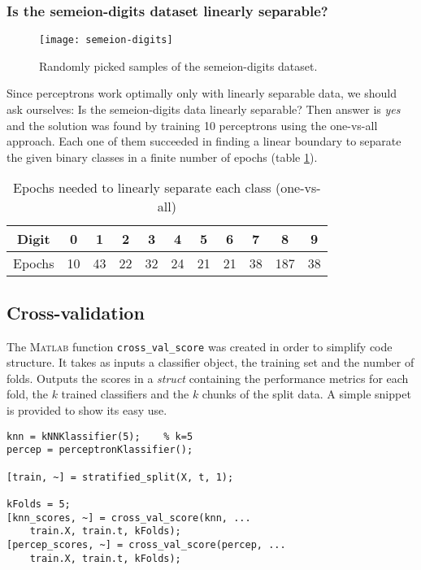 \subsubsection{Is the semeion-digits dataset linearly separable?}
\begin{figure}[]
	\centering
	\texttt{[image: semeion-digits]}
	\caption{Randomly picked samples of the semeion-digits dataset.}
	\label{fig:semeion-digits}
\end{figure}

Since perceptrons work optimally only with linearly separable data, we should ask ourselves: Is the semeion-digits data linearly separable? Then answer is \textit{yes} and the solution was found by training 10 perceptrons using the one-vs-all approach. Each one of them succeeded in finding a linear boundary to separate the given binary classes in a finite number of epochs (table \ref{tbl:epochs_per_class}).
\begin{table}[]
	\renewcommand{\arraystretch}{1.3}
	\caption{Epochs needed to linearly separate each class (one-vs-all)}
	\label{tbl:epochs_per_class}
	\centering
	\begin{tabular}{|c||c|c|c|c|c|c|c|c|c|c|}
		\hline
		Digit & 0 & 1 & 2 & 3 & 4 & 5 & 6 & 7 & 8 & 9 \\ \hline 
		Epochs & 10 & 43 & 22 & 32 & 24 & 21 & 21 & 38 & \color{red}187\color{black} & 38 \\ \hline 
	\end{tabular}
\end{table}

\subsection{Cross-validation}
The \textsc{Matlab} function \texttt{cross\_val\_score} was created in order to simplify code structure. It takes as inputs a classifier object, the training set and the number of folds. Outputs the scores in a \textit{struct} containing the performance metrics for each fold, the $k$ trained classifiers and the $k$ chunks of the split data. A simple snippet is provided to show its easy use.
\begin{lstlisting}
knn = kNNKlassifier(5);    % k=5
percep = perceptronKlassifier();

[train, ~] = stratified_split(X, t, 1);

kFolds = 5;
[knn_scores, ~] = cross_val_score(knn, ...
    train.X, train.t, kFolds);
[percep_scores, ~] = cross_val_score(percep, ...
    train.X, train.t, kFolds);
\end{lstlisting}

